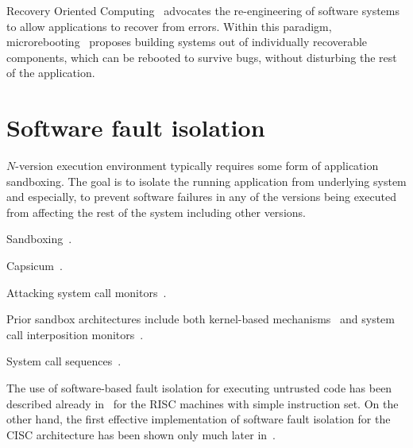 Recovery Oriented Computing~\cite{roc} advocates the re-engineering of
software systems to allow applications to recover from errors.  Within
this paradigm, microrebooting~\cite{microreboots} proposes building
systems out of individually recoverable components, which can be
rebooted to survive bugs, without disturbing the rest of the
application.

\section{Software fault isolation}

$N$-version execution environment typically requires some form of application
sandboxing. The goal is to isolate the running application from underlying
system and especially, to prevent software failures in any of the versions
being executed from affecting the rest of the system including other
versions.

Sandboxing~\cite{mbox,txbox,bascule,drawbridge}.

Capsicum~\cite{capsicum}.

Attacking system call monitors~\cite{watson07}.

Prior sandbox architectures include both kernel-based
mechanisms~\cite{tron,remus,subdomain,cots-hardening} and system call
interposition
monitors~\cite{mapbox,wily-hacker,jain1999,provos2002,usenix-sec03,janus}.

System call sequences~\cite{syscall-seq,sandeep06,gao04,sekar01,wespi00}.

The use of software-based fault isolation for executing untrusted code has been
described already in~\cite{sfi:sosp93} for the RISC machines with simple
instruction set. On the other hand, the first effective implementation of
software fault isolation for the CISC architecture has been shown only much
later in~\cite{cisc-sfi:usenix-sec06}.


